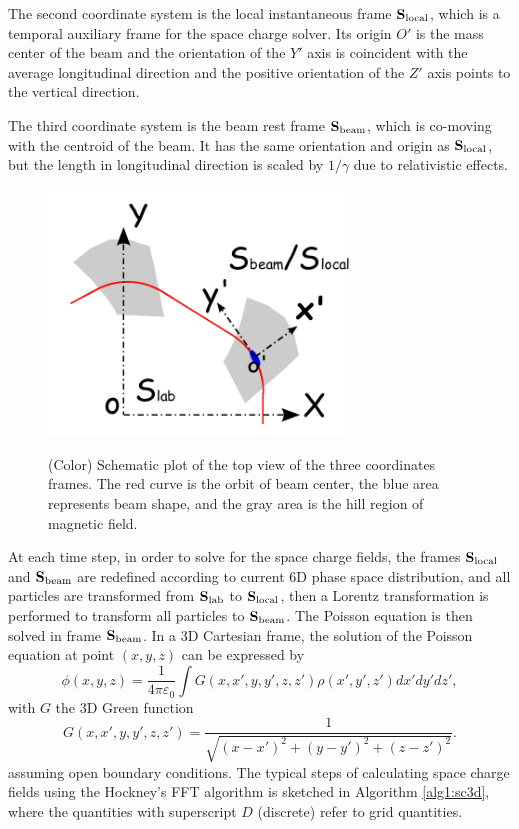 \documentclass[aps,prstab,twocolumn,superscriptaddress,showpacs]{revtex4}
\newcommand{\bs}[1]{\mathbf #1}
\begin{document}
The second coordinate system is the local instantaneous frame ${\bs{S}_{\RM{local}}}$, which is a temporal auxiliary frame for the space charge solver.
Its origin $O'$ is the mass center of the beam and the orientation of the $Y'$ axis is coincident with the average longitudinal direction and 
the positive orientation of the $Z'$ axis points to the vertical direction.

The third coordinate system is the beam rest frame $\bs{S}_{\RM{beam}}$, which is co-moving with the centroid of the beam. 
It has the same orientation and origin as ${\bs{S}_{\RM{local}}}$, but the length in longitudinal 
direction is scaled by $1/\gamma$ due to relativistic effects. 
  \begin{figure}
    {\includegraphics[width=8cm]{figures/SM-frame.pdf}}
    \caption{(Color) Schematic plot of the top view of the three coordinates frames. The red curve is the orbit of beam center, 
      the blue area represents beam shape, and the gray area is the hill region of magnetic field.}
    \label{fig:frame}
  \end{figure}

At each time step, in order to solve for the space charge fields, the frames $\bs{S}_{\RM{local}}$ and $\bs{S}_{\RM{beam}}$ are redefined according to current 6D 
phase space distribution, and all particles are transformed from $\bs{S}_{\RM{lab}}$ to $\bs{S}_{\RM{local}}$, 
then a Lorentz transformation is performed to transform all particles to $\bs{S}_{\RM{beam}}$.
The Poisson equation is then solved in frame $\bs{S}_{\RM{beam}}$. In a 3D Cartesian frame, the solution of the Poisson equation at point $(x,y,z)$ can be expressed by 
\begin{equation}\label{eq:Poten}
  \phi(x,y,z)= \frac{1}{4\pi\varepsilon_0}\int{G(x,x',y,y',z,z')\rho(x',y',z')dx'dy'dz'},
\end{equation}
with $G$ the 3D Green function 
\begin{equation}\label{eq:Green}
  G(x,x',y,y',z,z')= \frac{1}{\sqrt{(x-x')^2+(y-y')^2+(z-z')^2}}.
\end{equation}
assuming open boundary conditions.
The typical steps of calculating space charge fields using the Hockney's FFT algorithm \cite{Hockney:1} is sketched in Algorithm \ref{alg1:sc3d},
where the quantities with superscript $D$ (discrete) refer to grid quantities.
\end{document}
